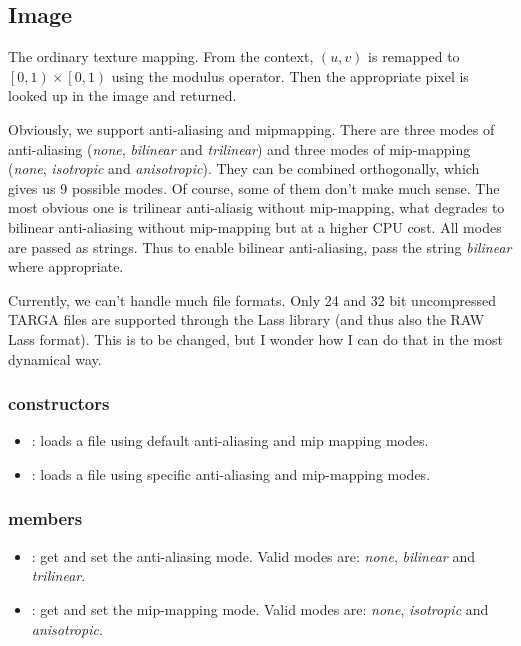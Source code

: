 \subsection{Image}

The ordinary texture mapping.  From the context, $\left(u, v\right)$ is remapped to $\left[0, 1\right) \times \left[0, 1\right)$ using the modulus operator.  Then the appropriate pixel is looked up in the image and returned.

Obviously, we support anti-aliasing and mipmapping.  There are three modes of anti-aliasing (\emph{none}, \emph{bilinear} and \emph{trilinear}) and three modes of mip-mapping (\emph{none}, \emph{isotropic} and \emph{anisotropic}).  They can be combined orthogonally, which gives us 9 possible modes.  Of course, some of them don't make much sense.  The most obvious one is trilinear anti-aliasig without mip-mapping, what degrades to bilinear anti-aliasing without mip-mapping but at a higher CPU cost.  All modes are passed as strings.  Thus to enable bilinear anti-aliasing, pass the string \emph{bilinear} where appropriate.

Currently, we can't handle much file formats.  Only 24 and 32 bit uncompressed TARGA files are supported through the Lass library (and thus also the RAW Lass format).  This is to be changed, but I wonder how I can do that in the most dynamical way.

\subsubsection*{constructors}
\begin{itemize}
	\item {}:
		loads a file using default anti-aliasing and mip mapping modes.
	\item {}:
		loads a file using specific anti-aliasing and mip-mapping modes.
\end{itemize}

\subsubsection*{members}
\begin{itemize}
	\item {}:
		get and set the anti-aliasing mode.  Valid modes are: \emph{none}, \emph{bilinear} and \emph{trilinear}.
	\item {}:
		get and set the mip-mapping mode.  Valid modes are: \emph{none}, \emph{isotropic} and \emph{anisotropic}.
\end{itemize}

